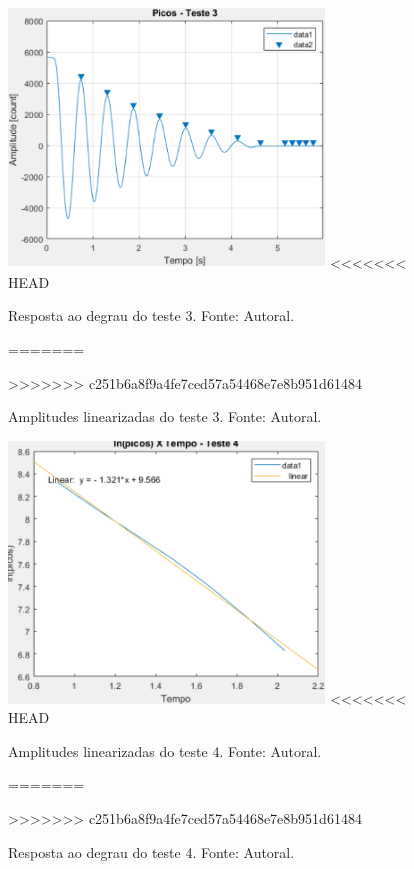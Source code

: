 \documentclass{ifacconf}
\begin{document}
\begin{figure}[!htb]
  \begin{center}
  \includegraphics[width=8.4cm]{figures/picos_teste_3.png}    %
<<<<<<< HEAD
  \caption{Resposta ao degrau do teste 3. Fonte: Autoral.} 
  \label{fig:picos_teste_3}
=======
  \caption{Amplitudes linearizadas do teste 3. Fonte: Autoral.} 
  \label{fig:regressao_teste_3}
>>>>>>> c251b6a8f9a4fe7ced57a54468e7e8b951d61484
  \end{center}
\end{figure}

\begin{figure}[!htb]
  \begin{center}
  \includegraphics[width=8.4cm]{figures/regressao_teste_4.png}    %
<<<<<<< HEAD
  \caption{Amplitudes linearizadas do teste 4. Fonte: Autoral.} 
  \label{fig:regressao_teste_4}
=======
  \caption{Resposta ao degrau do teste 4. Fonte: Autoral.} 
  \label{fig:picos_teste_4}
>>>>>>> c251b6a8f9a4fe7ced57a54468e7e8b951d61484
  \end{center}
\end{figure}
\end{document}
